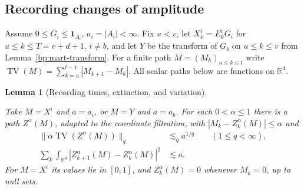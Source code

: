 \documentclass[11pt,letterpaper]{article}
\newtheorem{lemma}[theorem]{Lemma}
\theoremstyle{definition}
\newcommand{\R}{\mathbb R}
\newcommand{\ind}{\mathbf1}
\newcommand{\norm}[1]{\lVert#1\rVert}
\providecommand{\lean}[1]{}
\begin{document}
\subsection{Recording changes of amplitude}
Assume \(0\le G_i\le\ind_{A_i}\), \(a_i=|A_i|<\infty\).
Fix \(u<v\), let \(X^i_k=E_k^iG_i\) for
\(u\le k\le T=v+d+1\), \(i\ne b\), and let \(Y\) be the transform
of \(G_b\) on \(u\le k\le v\) from Lemma~\ref{bp:mart-transform}.
For a finite path \(M=(M_k)_{u\le k\le t}\) write
\(\operatorname{TV}(M)=\sum_{k=u}^{t-1}|M_{k+1}-M_k|\).
All scalar paths below are functions on \(\R^d\).

\begin{lemma}[Recording times, extinction, and variation]\label{bp:stopped-var}
\lean{TwistedParaproduct.stoppedVar}
Take \(M=X^i\) and \(a=a_i\), or \(M=Y\) and \(a=a_b\).
For each \(0<\alpha\le1\) there is a path \(Z^\alpha(M)\), adapted
to the coordinate filtration, with \(|M_k-Z^\alpha_k(M)|\le\alpha\) and
\begin{align*}
 \norm{\alpha\operatorname{TV}(Z^\alpha(M))}_q
      &\lesssim_q a^{1/q}\qquad(1\le q<\infty),\\
 \sum_k\int_{\R^d}|Z^\alpha_{k+1}(M)-Z^\alpha_k(M)|^2
      &\lesssim a .
\end{align*}
For \(M=X^i\) its values lie in \([0,1]\), and \(Z^\alpha_k(M)=0\)
whenever \(M_k=0\), up to null sets.
\end{lemma}
\end{document}
